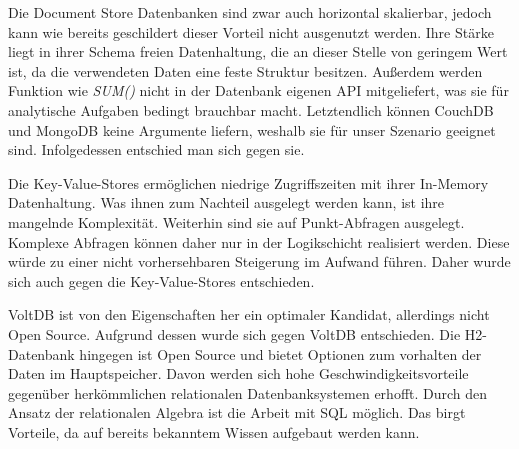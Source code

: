 Die Document Store Datenbanken sind zwar auch horizontal skalierbar, jedoch kann wie bereits geschildert dieser Vorteil nicht ausgenutzt werden. Ihre Stärke liegt in ihrer Schema freien Datenhaltung, die an dieser Stelle von geringem Wert ist, da die verwendeten Daten eine feste Struktur besitzen. Außerdem werden Funktion wie \textit{SUM()} nicht in der Datenbank eigenen API mitgeliefert, was sie für analytische Aufgaben bedingt brauchbar macht. Letztendlich können CouchDB und MongoDB keine Argumente liefern, weshalb sie für unser Szenario geeignet sind. Infolgedessen entschied man sich gegen sie.

Die Key-Value-Stores ermöglichen niedrige Zugriffszeiten mit ihrer In-Memory Datenhaltung. Was ihnen zum Nachteil ausgelegt werden kann, ist ihre mangelnde Komplexität. Weiterhin sind sie auf Punkt-Abfragen ausgelegt. Komplexe Abfragen können daher nur in der Logikschicht realisiert werden. Diese würde zu einer nicht vorhersehbaren Steigerung im Aufwand führen. Daher wurde sich auch gegen die Key-Value-Stores entschieden. 

VoltDB ist von den Eigenschaften her ein optimaler Kandidat, allerdings nicht Open Source. Aufgrund dessen wurde sich gegen VoltDB entschieden. Die H2-Datenbank hingegen ist Open Source und bietet Optionen zum vorhalten der Daten im Hauptspeicher. Davon werden sich hohe Geschwindigkeitsvorteile gegenüber herkömmlichen relationalen Datenbanksystemen erhofft. Durch den Ansatz der relationalen Algebra ist die Arbeit mit SQL möglich. Das birgt Vorteile, da auf bereits bekanntem Wissen aufgebaut werden kann.